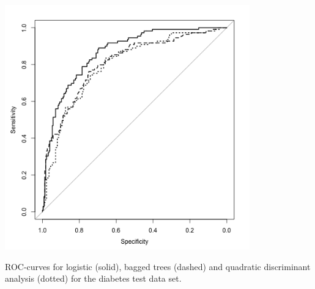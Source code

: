 \documentclass[]{article}
\begin{document}
\includegraphics[width=300pt]{ROC}

ROC-curves for logistic (solid), bagged trees (dashed) and quadratic
discriminant analysis (dotted) for the diabetes test data set.
\end{document}
